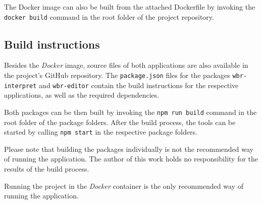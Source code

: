 The Docker image can also be built from the attached Dockerfile by invoking the \texttt{docker build} command in the root folder of the project repository.

\subsection{Build instructions}
Besides the \textit{Docker} image, source files of both applications are also available in the project's GitHub repository. 
The \texttt{package.json} files for the packages \texttt{wbr-interpret} and \texttt{wbr-editor} contain the build instructions for the respective applications,
as well as the required dependencies.


Both packages can be then built by invoking the \texttt{npm run build} command in the root folder of the package folders.
After the build process, the tools can be started by calling \texttt{npm start} in the respective package folders.

Please note that building the packages individually is not the recommended way of running the application.
The author of this work holds no responsibility for the results of the build process.

Running the project in the \textit{Docker} container is the only recommended way of running the application.